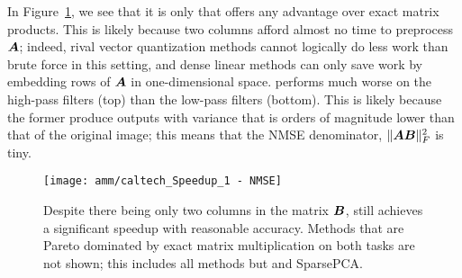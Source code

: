 In Figure~\ref{fig:caltech}, we see that it is only \oursp that offers any advantage over exact matrix products. This is likely because two columns afford almost no time to preprocess $\bm{A}$; indeed, rival vector quantization methods cannot logically do less work than brute force in this setting, and dense linear methods can only save work by embedding rows of $\bm{A}$ in one-dimensional space.
\oursp performs much worse on the high-pass filters (top) than the low-pass filters (bottom). This is likely because the former produce outputs with variance that is orders of magnitude lower than that of the original image; this means that the NMSE denominator, $\lVert\bm{A}\bm{B}\rVert^2_F$ is tiny.  %

\begin{figure}[h]
\begin{center}
\texttt{[image: amm/caltech\_Speedup\_1 - NMSE]}
\caption{Despite there being only two columns in the matrix $\bm{B}$, \oursp still achieves a significant speedup with reasonable accuracy. Methods that are Pareto dominated by exact matrix multiplication on both tasks are not shown; this includes all methods but \oursp and SparsePCA.} %
\label{fig:caltech}
\end{center}
\end{figure}


